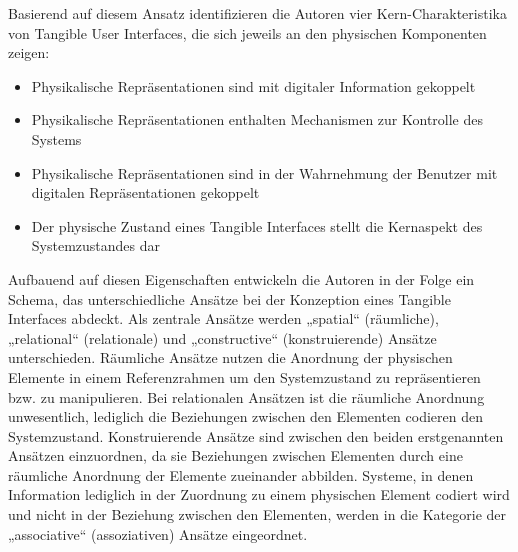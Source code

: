 Basierend auf diesem Ansatz identifizieren die Autoren vier Kern-Charakteristika von Tangible User Interfaces, die sich jeweils an den physischen Komponenten zeigen:
\begin{itemize}
	\item Physikalische Repräsentationen sind mit digitaler Information gekoppelt
	\item Physikalische Repräsentationen enthalten Mechanismen zur Kontrolle des Systems
	\item Physikalische Repräsentationen sind in der Wahrnehmung der Benutzer mit digitalen Repräsentationen gekoppelt
	\item Der physische Zustand eines Tangible Interfaces stellt die Kernaspekt des Systemzustandes dar
\end{itemize}

Aufbauend auf diesen Eigenschaften entwickeln die Autoren in der Folge ein Schema, das unterschiedliche Ansätze bei der Konzeption eines Tangible Interfaces abdeckt. Als zentrale Ansätze werden „spatial“ (räumliche), „relational“ (relationale) und „constructive“ (konstruierende) Ansätze unterschieden. Räumliche Ansätze nutzen die Anordnung der physischen Elemente in einem Referenzrahmen um den Systemzustand zu repräsentieren bzw. zu manipulieren. Bei relationalen Ansätzen ist die räumliche Anordnung unwesentlich, lediglich die Beziehungen zwischen den Elementen codieren den Systemzustand. Konstruierende Ansätze sind zwischen den beiden erstgenannten Ansätzen einzuordnen, da sie Beziehungen zwischen Elementen durch eine räumliche Anordnung der Elemente zueinander abbilden. Systeme, in denen Information lediglich in der Zuordnung zu einem physischen Element codiert wird und nicht in der Beziehung zwischen den Elementen, werden in die Kategorie der „associative“ (assoziativen) Ansätze eingeordnet.

